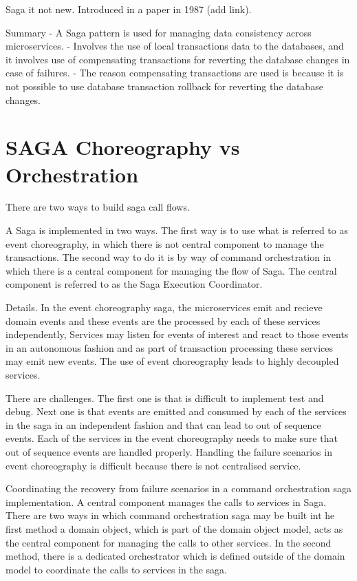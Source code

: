 \documentclass[a4paper, 11pt]{book}
\begin{document}
    Saga it not new. Introduced in a paper in 1987 (add link).

    Summary
    - A Saga pattern is used for managing data consistency across microservices.
    - Involves the use of local transactions data to the databases, and it involves use of compensating transactions for reverting the database changes in case of failures.
    - The reason compensating transactions are used is because it is not possible to use database transaction rollback for reverting the database changes.


    \section{SAGA Choreography vs Orchestration}

    There are two ways to build saga call flows.

    A Saga is implemented in two ways.
    The first way is to use what is referred to as event choreography, in which there is not central component to manage the transactions.
    The second way to do it is by way of command orchestration in which there is a central component for managing the flow of Saga.
    The central component is referred to as the Saga Execution Coordinator.

    Details.
    In the event choreography saga, the microservices emit and recieve domain events and these events are the processed by each of these services independently,
    Services may listen for events of interest and react to those events in an autonomous fashion and as part of transaction processing these services may emit new events.
    The use of event choreography leads to highly decoupled services.

    There are challenges.
    The first one is that is difficult to implement test and debug.
    Next one is that events are emitted and consumed by each of the services in the saga in an independent fashion and that can lead to out of sequence events.
    Each of the services in the event choreography needs to make sure that out of sequence events are handled properly.
    Handling the failure scenarios in event choreography is difficult because there is not centralised service.

    Coordinating the recovery from failure scenarios in a command orchestration saga implementation.
    A central component manages the calls to services in Saga.
    There are two ways in which command orchestration saga may be built int he first method a domain object, which is part of the domain object model, acts as the central component for managing the calls to other services.
    In the second method, there is a dedicated orchestrator which is defined outside of the domain model to coordinate the calls to services in the saga.
\end{document}
